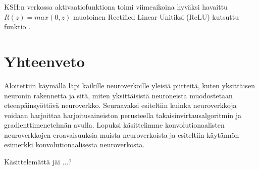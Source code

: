 \documentclass[finnish]{tktltiki2}
\theoremstyle{definition}
\theoremstyle{remark}
\begin{document}
    KSH:n verkossa aktivaatiofunktiona toimi viimeaikoina hyväksi havaittu $R(z) = max(0, z)$ muotoinen Rectified Linear Unitiksi (ReLU) kutsuttu funktio \cite{KSHimagenet2012}.

\section{Yhteenveto} 

Aloitettiin käymällä läpi kaikille neuroverkoille yleisiä piirteitä, kuten yksittäisen neuronin rakennetta ja sitä, miten yksittäisistä neuroneista muodostetaan eteenpäinsyöttävä neuroverkko. Seuraavaksi esiteltiin kuinka neuroverkkoja voidaan harjoittaa harjoitusaineiston perusteella takaisinvirtausalgoritmin ja gradienttimenetelmän avulla. Lopuksi käsittelimme konvolutionaalisten neuroverkkojen eroavaisuuksia muista neuroverkoista ja esiteltiin käytännön esimerkki konvolutionaalisesta neuroverkosta.

Käsittelemättä jäi ...?







  
  





  
\end{document}
